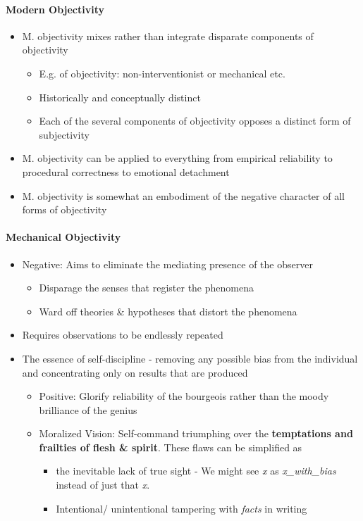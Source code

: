 \documentclass[a4paper]{article}
\begin{document}
\paragraph{Modern Objectivity}
\begin{itemize}
	\item M. objectivity mixes rather than integrate disparate components of objectivity
	\begin{itemize}[label=$\circ$]
		\item E.g. of objectivity: non-interventionist or mechanical etc.
		\item Historically and conceptually distinct
		\item Each of the several components of objectivity opposes a distinct form of subjectivity
	\end{itemize}
	\item M. objectivity can be applied to everything from empirical reliability to procedural correctness to emotional detachment
	\item M. objectivity is somewhat an embodiment of the negative character of all forms of objectivity
\end{itemize}

\paragraph{Mechanical Objectivity}
\begin{itemize}
	\item Negative: Aims to eliminate the mediating presence of the observer
	\begin{itemize}[label=$\circ$]
		\item Disparage the senses that register the phenomena
		\item Ward off theories \& hypotheses that distort the phenomena
	\end{itemize}
	\item Requires observations to be endlessly repeated
	\item The essence of self-discipline - removing any possible bias from the individual and concentrating only on results that are produced
	\begin{itemize}[label=$\circ$]
		\item Positive: Glorify reliability of the bourgeois rather than the moody brilliance of the genius
		\item Moralized Vision: Self-command triumphing over the \textbf{temptations and frailties of flesh \& spirit}. These flaws can be simplified as
		\begin{itemize}[label=\tiny$\blacksquare$]
			\item the inevitable lack of true sight - We might see \textit{x} as \textit{x\_with\_bias} instead of just that \textit{x}.
			\item Intentional/ unintentional tampering with \textit{facts} in writing 
		\end{itemize}
	\end{itemize}
\end{itemize}
\end{document}
